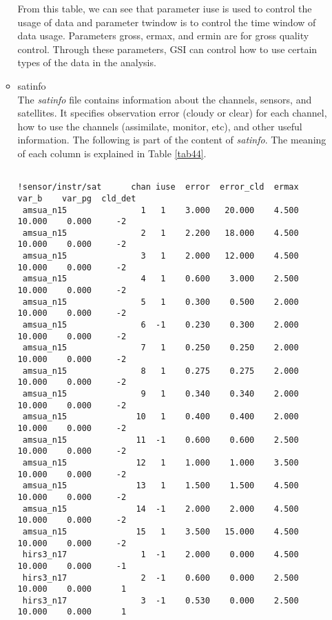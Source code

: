\begin{enumerate}[leftmargin=*]
\begin{itemize}[leftmargin=*]
From this table, we can see that parameter iuse is used to control the usage of data and parameter twindow is to control the time window of data usage. Parameters gross, ermax, and ermin are for gross quality control.  Through these parameters, GSI can control how to use certain types of the data in the analysis.\\

\item satinfo\\

The \textit{satinfo} file contains information about the channels, sensors, and satellites.  It specifies observation error (cloudy or clear) for each channel, how to use the channels (assimilate, monitor, etc), and other useful information. The following is part of the content of \textit{satinfo}. The meaning of each column is explained in Table \ref{tab44}.

\begin{scriptsize}
\begin{verbatim}

!sensor/instr/sat      chan iuse  error  error_cld  ermax   var_b    var_pg  cld_det
 amsua_n15               1   1    3.000   20.000    4.500   10.000    0.000     -2
 amsua_n15               2   1    2.200   18.000    4.500   10.000    0.000     -2
 amsua_n15               3   1    2.000   12.000    4.500   10.000    0.000     -2
 amsua_n15               4   1    0.600    3.000    2.500   10.000    0.000     -2
 amsua_n15               5   1    0.300    0.500    2.000   10.000    0.000     -2
 amsua_n15               6  -1    0.230    0.300    2.000   10.000    0.000     -2
 amsua_n15               7   1    0.250    0.250    2.000   10.000    0.000     -2
 amsua_n15               8   1    0.275    0.275    2.000   10.000    0.000     -2
 amsua_n15               9   1    0.340    0.340    2.000   10.000    0.000     -2
 amsua_n15              10   1    0.400    0.400    2.000   10.000    0.000     -2
 amsua_n15              11  -1    0.600    0.600    2.500   10.000    0.000     -2
 amsua_n15              12   1    1.000    1.000    3.500   10.000    0.000     -2
 amsua_n15              13   1    1.500    1.500    4.500   10.000    0.000     -2
 amsua_n15              14  -1    2.000    2.000    4.500   10.000    0.000     -2
 amsua_n15              15   1    3.500   15.000    4.500   10.000    0.000     -2
 hirs3_n17               1  -1    2.000    0.000    4.500   10.000    0.000     -1
 hirs3_n17               2  -1    0.600    0.000    2.500   10.000    0.000      1
 hirs3_n17               3  -1    0.530    0.000    2.500   10.000    0.000      1
\end{verbatim}
\end{scriptsize}


\end{itemize}
\end{enumerate}
